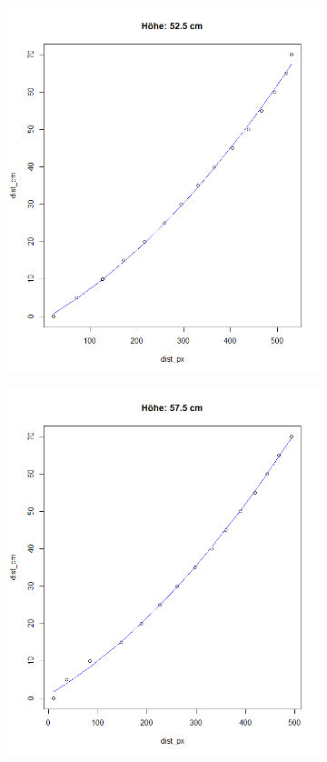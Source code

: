 \documentclass[a4paper]{report}
\begin{document}
\begin{figure}[h]
	\centering
	\begin{subfigure}[b]{0.3\textwidth}
		\includegraphics[width=\textwidth]{hoehe52_5}
	\end{subfigure}
	\quad
	\begin{subfigure}[b]{0.3\textwidth}
		\includegraphics[width=\textwidth]{hoehe57_5}

\end{subfigure}
\end{figure}
\end{document}
